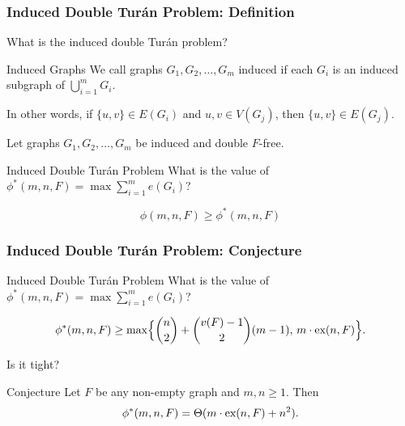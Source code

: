 \documentclass{beamer}
\newcommand*{\ex}{\textnormal{ex}}
\begin{document}
\begin{frame}
  \frametitle{Induced Double Turán Problem: Definition}

  What is the \alert{induced} double Turán problem? \pause

  \begin{block}{Induced Graphs}
    We call graphs $G_1, G_2, \ldots, G_m$ \alert{induced} if each $G_i$ is an induced subgraph of $\bigcup_{i = 1}^m G_i$.
  \end{block}

  \pause

  In other words, if $\{u, v\} \in E(G_i)$ and $u, v \in V(G_j)$, then $\{u, v\} \in E(G_j)$.

  \pause

  \vspace{0.5cm}

  Let graphs $G_1, G_2, \ldots, G_m$ be induced and double $F$-free.

  \begin{block}{Induced Double Turán Problem}
    What is the value of $\phi^*(m, n, F) = \max \sum_{i = 1}^m e(G_i)$?
  \end{block}

  \pause

  \[
    \phi(m, n, F) \geq \phi^*(m, n, F)
  \]
\end{frame}

\begin{frame}

  \frametitle{Induced Double Turán Problem: Conjecture}

  \begin{block}{Induced Double Turán Problem}
    What is the value of $\phi^*(m, n, F) = \max \sum_{i = 1}^m e(G_i)$?
  \end{block}

  \[
    \phi^*(m, n, F) \geq \max\Bigl\{\binom{n}{2} + \binom{v(F) - 1}{2}(m - 1), \, m \cdot \ex(n,F)\Bigr\}.
  \]

  \pause

  Is it tight?

  \pause

  \begin{block}{Conjecture}
    Let $F$ be any non-empty graph and $m, n \geq 1$. Then
    \[ 
      \phi^*(m,n,F) = \Theta(m \cdot \ex(n,F) + n^2).
    \]
  \end{block}
\end{frame}
\end{document}

